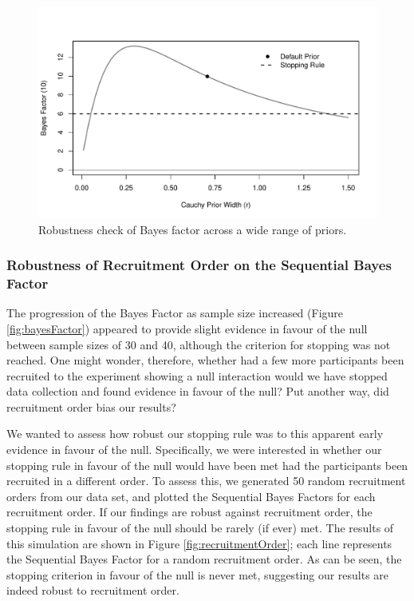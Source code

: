 \documentclass[a4paper, doc, natbib]{apa6}
\begin{document}
\begin{figure}
\begin{center}
\includegraphics[width = \textwidth]{Images/robustPrior.pdf}
\caption{Robustness check of Bayes factor across a wide range of priors.}
\label{fig:robustPrior}
\end{center}
\end{figure}


\subsubsection{Robustness of Recruitment Order on the Sequential Bayes Factor}
The progression of the Bayes Factor as sample size increased (Figure \ref{fig:bayesFactor}) appeared to provide slight evidence in favour of the null between sample sizes of 30 and 40, although the criterion for stopping was not reached. One might wonder, therefore, whether had a few more participants been recruited to the experiment showing a null interaction would we have stopped data collection and found evidence in favour of the null? Put another way, did recruitment order bias our results?

We wanted to assess how robust our stopping rule was to this apparent early evidence in favour of the null. Specifically, we were interested in whether our stopping rule in favour of the null would have been met had the participants been recruited in a different order. To assess this, we generated 50 random recruitment orders from our data set, and plotted the Sequential Bayes Factors for each recruitment order. If our findings are robust against recruitment order, the stopping rule in favour of the null should be rarely (if ever) met.  The results of this simulation are shown in Figure \ref{fig:recruitmentOrder}; each line represents the Sequential Bayes Factor for a random recruitment order. As can be seen, the stopping criterion in favour of the null is never met, suggesting our results are indeed robust to recruitment order. 
\end{document}

